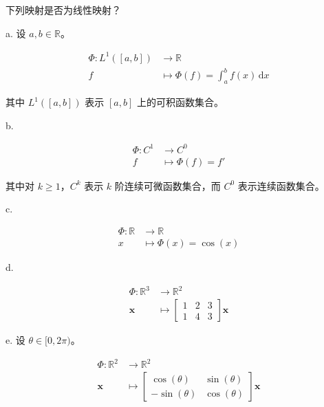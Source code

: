 下列映射是否为线性映射？

a. 设 $ a, b \in \mathbb{R} $。

\begin{equation*}
\begin{aligned}
\Phi : L^1([a, b]) &\to \mathbb{R} \\
f &\mapsto \Phi(f) = \int_a^b f(x)\,\mathrm{d}x
\end{aligned}
\end{equation*}

其中 $ L^1([a, b]) $ 表示 $ [a, b] $ 上的可积函数集合。

b.

\begin{equation*}
\begin{aligned}
\Phi : C^1 &\to C^0 \\
f &\mapsto \Phi(f) = f'
\end{aligned}
\end{equation*}

其中对 $ k \geqslant 1 $，$ C^k $ 表示 $ k $ 阶连续可微函数集合，而 $ C^0 $ 表示连续函数集合。

c.

\begin{equation*}
\begin{aligned}
\Phi : \mathbb{R} &\to \mathbb{R} \\
x &\mapsto \Phi(x) = \cos(x)
\end{aligned}
\end{equation*}

d.

\begin{equation*}
\begin{aligned}
\Phi : \mathbb{R}^3 &\to \mathbb{R}^2 \\
\boldsymbol{x} &\mapsto \begin{bmatrix} 1 & 2 & 3 \\ 1 & 4 & 3 \end{bmatrix} \boldsymbol{x}
\end{aligned}
\end{equation*}

e. 设 $ \theta \in [0, 2\pi) $。

\begin{equation*}
\begin{aligned}
\Phi : \mathbb{R}^2 &\to \mathbb{R}^2 \\
\boldsymbol{x} &\mapsto \begin{bmatrix} \cos(\theta) & \sin(\theta) \\ -\sin(\theta) & \cos(\theta) \end{bmatrix} \boldsymbol{x}
\end{aligned}
\end{equation*}

